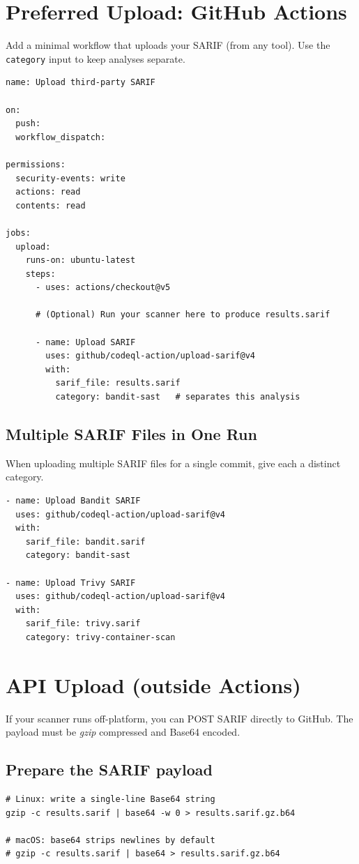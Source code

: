 \documentclass[11pt,a4paper]{article}
\newcommand{\term}[1]{\texttt{#1}}
\begin{document}
\section{Preferred Upload: GitHub Actions}
Add a minimal workflow that uploads your SARIF (from any tool). Use the \term{category} input to keep analyses separate.
\begin{verbatim}
name: Upload third-party SARIF

on:
  push:
  workflow_dispatch:

permissions:
  security-events: write
  actions: read
  contents: read

jobs:
  upload:
    runs-on: ubuntu-latest
    steps:
      - uses: actions/checkout@v5

      # (Optional) Run your scanner here to produce results.sarif

      - name: Upload SARIF
        uses: github/codeql-action/upload-sarif@v4
        with:
          sarif_file: results.sarif
          category: bandit-sast   # separates this analysis
\end{verbatim}

\subsection{Multiple SARIF Files in One Run}
When uploading multiple SARIF files for a single commit, give each a distinct category.
\begin{verbatim}
- name: Upload Bandit SARIF
  uses: github/codeql-action/upload-sarif@v4
  with:
    sarif_file: bandit.sarif
    category: bandit-sast

- name: Upload Trivy SARIF
  uses: github/codeql-action/upload-sarif@v4
  with:
    sarif_file: trivy.sarif
    category: trivy-container-scan
\end{verbatim}
\clearpage

\section{API Upload (outside Actions)}
If your scanner runs off-platform, you can POST SARIF directly to GitHub. The payload must be \emph{gzip} compressed and Base64 encoded.

\subsection{Prepare the SARIF payload}
\begin{verbatim}
# Linux: write a single-line Base64 string
gzip -c results.sarif | base64 -w 0 > results.sarif.gz.b64

# macOS: base64 strips newlines by default
# gzip -c results.sarif | base64 > results.sarif.gz.b64
\end{verbatim}
\end{document}
